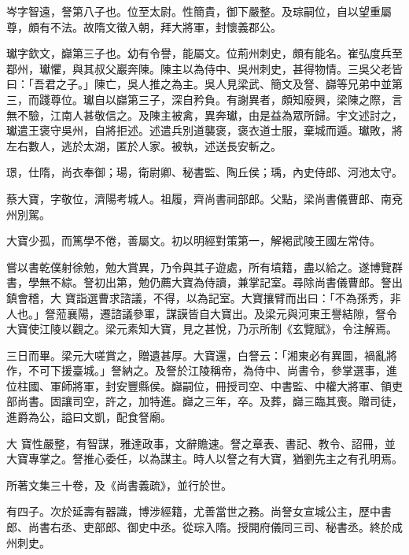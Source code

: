 \begin{pinyinscope}
 岑字智遠，詧第八子也。位至太尉。性簡貴，御下嚴整。及琮嗣位，自以望重屬尊，頗有不法。故隋文徵入朝，拜大將軍，封懷義郡公。



 瓛字欽文，巋第三子也。幼有令譽，能屬文。位荊州刺史，頗有能名。崔弘度兵至鄀州，瓛懼，與其叔父巖奔陳。陳主以為侍中、吳州刺史，甚得物情。三吳父老皆曰：「吾君之子。」陳亡，吳人推之為主。吳人見梁武、簡文及詧、巋等兄弟中並第三，而踐尊位。瓛自以巋第三子，深自矜負。有謝異者，頗知廢興，梁陳之際，言無不驗，江南人甚敬信之。及陳主被禽，異奔瓛，由是益為眾所歸。宇文述討之，
 瓛遣王褒守吳州，自將拒述。述遣兵別道襲褒，褒衣道士服，棄城而遁。瓛敗，將左右數人，逃於太湖，匿於人家。被執，述送長安斬之。



 璟，仕隋，尚衣奉御；瑒，衛尉卿、秘書監、陶丘侯；瑀，內史侍郎、河池太守。



 蔡大寶，字敬位，濟陽考城人。祖履，齊尚書祠部郎。父點，梁尚書儀曹郎、南兗州別駕。



 大寶少孤，而篤學不倦，善屬文。初以明經對策第一，解褐武陵王國左常侍。



 嘗以書乾僕射徐勉，勉大賞異，乃令與其子遊處，所有墳籍，盡以給之。遂博覽群書，學無不綜。詧初出第，勉仍薦大寶為侍讀，兼掌記室。尋除尚書儀曹郎。詧出鎮會稽，大
 寶詣選曹求諮議，不得，以為記室。大寶攘臂而出曰：「不為孫秀，非人也。」詧蒞襄陽，遷諮議參軍，謀謨皆自大寶出。及梁元與河東王譽結隙，詧令大寶使江陵以觀之。梁元素知大寶，見之甚悅，乃示所制《玄覽賦》，令注解焉。



 三日而畢。梁元大嗟賞之，贈遺甚厚。大寶還，白詧云：「湘東必有異圖，禍亂將作，不可下援臺城。」詧納之。及詧於江陵稱帝，為侍中、尚書令，參掌選事，進位柱國、軍師將軍，封安豐縣侯。巋嗣位，冊授司空、中書監、中權大將軍、領吏部尚書。固讓司空，許之，加特進。巋之三年，卒。及葬，巋三臨其喪。贈司徒，進爵為公，謚曰文凱，配食詧廟。



 大
 寶性嚴整，有智謀，雅達政事，文辭贍速。詧之章表、書記、教令、詔冊，並大寶專掌之。詧推心委任，以為謀主。時人以詧之有大寶，猶劉先主之有孔明焉。



 所著文集三十卷，及《尚書義疏》，並行於世。



 有四子。次於延壽有器識，博涉經籍，尤善當世之務。尚詧女宣城公主，歷中書郎、尚書右丞、吏部郎、御史中丞。從琮入隋。授開府儀同三司、秘書丞。終於成州刺史。




\end{pinyinscope}
